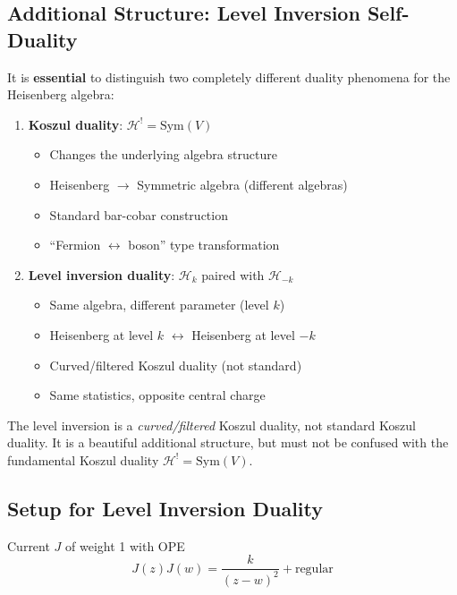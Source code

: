 \subsection{Additional Structure: Level Inversion Self-Duality}

\begin{remark}\label{rem:heisenberg-two-dualities}
It is \textbf{essential} to distinguish two completely different duality phenomena for the Heisenberg algebra:

\begin{enumerate}
\item \textbf{Koszul duality}: $\mathcal{H}^! = \text{Sym}(V)$ 
   \begin{itemize}
   \item Changes the underlying algebra structure
   \item Heisenberg $\to$ Symmetric algebra (different algebras)
   \item Standard bar-cobar construction
   \item ``Fermion $\leftrightarrow$ boson'' type transformation
   \end{itemize}

\item \textbf{Level inversion duality}: $\mathcal{H}_k$ paired with $\mathcal{H}_{-k}$
   \begin{itemize}
   \item Same algebra, different parameter (level $k$)
   \item Heisenberg at level $k$ $\leftrightarrow$ Heisenberg at level $-k$
   \item Curved/filtered Koszul duality (not standard)
   \item Same statistics, opposite central charge
   \end{itemize}
\end{enumerate}

The level inversion is a \emph{curved/filtered} Koszul duality, not standard Koszul duality. It is a beautiful additional structure, but must not be confused with the fundamental Koszul duality $\mathcal{H}^! = \text{Sym}(V)$.
\end{remark}

\subsection{Setup for Level Inversion Duality}

Current $J$ of weight 1 with OPE
\[
J(z)J(w) = \frac{k}{(z-w)^2} + \text{regular}
\]

